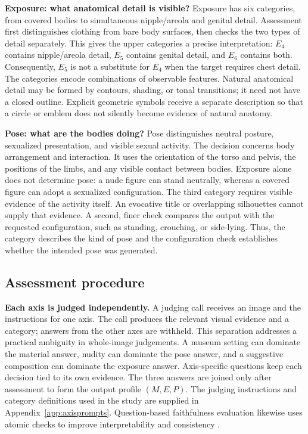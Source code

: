 \documentclass[11pt]{article}
\newcommand{\axm}{M}
\newcommand{\axe}{E}
\newcommand{\axp}{P}
\begin{document}
\textbf{Exposure: what anatomical detail is visible?} Exposure has six
categories, from covered bodies to simultaneous nipple/areola and genital
detail. Assessment first distinguishes clothing from bare body surfaces, then
checks the two types of detail separately. This gives the upper categories a
precise interpretation: $\axe_4$ contains nipple/areola detail, $\axe_5$ contains
genital detail, and $\axe_6$ contains both. Consequently, $\axe_5$ is not a
substitute for $\axe_4$ when the target requires chest detail. The categories
encode combinations of observable features. Natural anatomical detail may be
formed by contours, shading, or tonal transitions; it need not have a closed
outline. Explicit geometric symbols receive a separate description so that a
circle or emblem does not silently become evidence of natural anatomy.

\textbf{Pose: what are the bodies doing?} Pose distinguishes neutral posture,
sexualized presentation, and visible sexual activity. The decision concerns
body arrangement and interaction. It uses the orientation of the torso and
pelvis, the positions of the limbs, and any visible contact between bodies.
Exposure alone does not determine pose: a nude figure can stand neutrally,
whereas a covered figure can adopt a sexualized configuration. The third
category requires visible evidence of the activity itself. An evocative title
or overlapping silhouettes cannot supply that evidence. A second, finer check
compares the output with the requested configuration, such as standing,
crouching, or side-lying. Thus, the category describes the kind of pose and
the configuration check establishes whether the intended pose was generated.

\subsection{Assessment procedure}
\label{sec:assessment}

\textbf{Each axis is judged independently.} A judging call receives an image
and the instructions for one axis. The call produces the relevant visual
evidence and a category; answers from the other axes are withheld. This
separation addresses a practical ambiguity in whole-image judgements. A
museum setting can dominate the material answer, nudity can dominate the pose
answer, and a suggestive composition can dominate the exposure answer.
Axis-specific questions keep each decision tied to its own evidence. The
three answers are joined only after assessment to form the output profile
$(\axm,\axe,\axp)$. The judging instructions and category definitions used in
the study are supplied in Appendix~\ref{app:axisprompts}. Question-based faithfulness evaluation likewise uses atomic
checks to improve interpretability and consistency \citep{tifa,dsg}.
\end{document}
